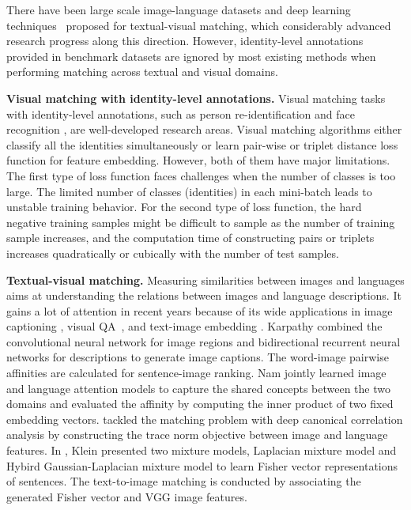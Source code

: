 There have been large scale image-language datasets and deep learning techniques~\cite{lin2014microsoft, krishna2016visual, Antol_2015_ICCV, young2014image, hodosh2013framing} proposed for textual-visual matching, which considerably advanced research progress along this direction. However, identity-level annotations provided in benchmark datasets are ignored by most existing methods when performing matching across textual and visual domains.


\textbf{Visual matching with identity-level annotations.} Visual matching tasks with identity-level annotations, such as person re-identification \cite{zhang2016learning,xiao2017joint,ahmed2015improved,liao2015person,zheng2016person,xiao2017joint,Zhao_2017_CVPR} and face recognition \cite{masi2016pose,schroff2015facenet}, are well-developed research areas. Visual matching algorithms either classify all the identities simultaneously \cite{liao2015person,kumar2009attribute,xiao2016learning} or learn pair-wise or triplet distance loss function \cite{ahmed2015improved,masi2016pose,schroff2015facenet,cheng2016person} for feature embedding. However, both of them have major limitations. The first type of loss function faces challenges  when the number of classes is too large. The limited number of classes (identities) in each mini-batch leads to unstable training behavior. For the second type of loss function, the hard negative training samples might be difficult to sample as the number of training sample increases, and the computation time of constructing pairs or triplets increases quadratically or cubically with the number of test samples.


\textbf{Textual-visual matching.} Measuring similarities between images and languages aims at understanding the relations between images and language descriptions. It gains a lot of attention in recent years because of its wide applications in image captioning \cite{mao2014deep,vinyals2015show,karpathy2015deep,Chen_2015_CVPR}, visual QA~\cite{Antol_2015_ICCV, zhu2016visual7w, nam2016dual, lu2016hierarchical}, and text-image embedding \cite{frome2013devise,reed2016learning,klein2015associating,Yan_2015_CVPR,wang2016learning}. Karpathy \etal \cite{karpathy2015deep} combined the convolutional neural network for image regions and bidirectional recurrent neural networks for descriptions to generate image captions.
The word-image pairwise affinities are calculated for sentence-image ranking. Nam \etal \cite{nam2016dual} jointly learned image and language attention models to capture the shared concepts between the two domains and evaluated the affinity by computing the inner product of two fixed embedding vectors. \cite{Yan_2015_CVPR} tackled the matching problem with deep canonical correlation analysis by constructing the trace norm objective between image and language features. In \cite{klein2015associating}, Klein \etal presented two mixture models, Laplacian mixture model and Hybird Gaussian-Laplacian mixture model to learn Fisher vector representations of sentences. The text-to-image matching is conducted by associating the generated Fisher vector and VGG image features.


